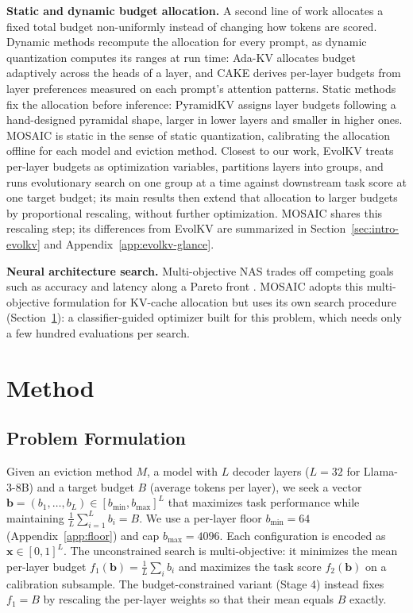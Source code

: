 \documentclass[11pt]{article}
\begin{document}
\textbf{Static and dynamic budget allocation.} A second line of work allocates a fixed total budget non-uniformly instead of changing how tokens are scored. Dynamic methods recompute the allocation for every prompt, as dynamic quantization computes its ranges at run time: Ada-KV \citep{feng2025adakv} allocates budget adaptively across the heads of a layer, and CAKE \citep{qin2025cake} derives per-layer budgets from layer preferences measured on each prompt's attention patterns. Static methods fix the allocation before inference: PyramidKV \citep{cai2025pyramidkv} assigns layer budgets following a hand-designed pyramidal shape, larger in lower layers and smaller in higher ones. MOSAIC is static in the sense of static quantization, calibrating the allocation offline for each model and eviction method. Closest to our work, EvolKV \citep{yu2025evolkv} treats per-layer budgets as optimization variables, partitions layers into groups, and runs evolutionary search on one group at a time against downstream task score at one target budget; its main results then extend that allocation to larger budgets by proportional rescaling, without further optimization. MOSAIC shares this rescaling step; its differences from EvolKV are summarized in Section~\ref{sec:intro-evolkv} and Appendix~\ref{app:evolkv-glance}.

\textbf{Neural architecture search.} Multi-objective NAS trades off competing goals such as accuracy and latency along a Pareto front \citep{elsken2018neural}. MOSAIC adopts this multi-objective formulation for KV-cache allocation but uses its own search procedure (Section~\ref{sec:method}): a classifier-guided optimizer built for this problem, which needs only a few hundred evaluations per search.

\section{Method}
\label{sec:method}

\subsection{Problem Formulation}

Given an eviction method $M$, a model with $L$ decoder layers ($L = 32$ for Llama-3-8B) and a target budget $B$ (average tokens per layer), we seek a vector $\mathbf{b} = (b_1, \ldots, b_L) \in [b_{\min}, b_{\max}]^L$ that maximizes task performance while maintaining $\frac{1}{L}\sum_{i=1}^{L} b_i = B$. We use a per-layer floor $b_{\min} = 64$ (Appendix~\ref{app:floor}) and cap $b_{\max} = 4096$. Each configuration is encoded as $\mathbf{x} \in [0,1]^L$. The unconstrained search is multi-objective: it minimizes the mean per-layer budget $f_1(\mathbf{b}) = \frac{1}{L}\sum_i b_i$ and maximizes the task score $f_2(\mathbf{b})$ on a calibration subsample. The budget-constrained variant (Stage 4) instead fixes $f_1 = B$ by rescaling the per-layer weights so that their mean equals $B$ exactly.
\end{document}

